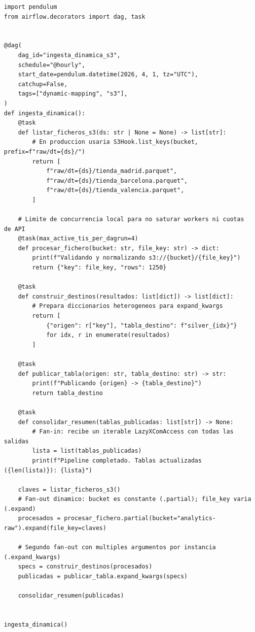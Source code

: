 \begin{lstlisting}[style=python, caption={Fan-out y fan-in dinámico sobre ficheros descubiertos en S3 con \code{.partial()}, \code{.expand()} y \code{expand\_kwargs()}.}, label={lst:dynamic-task-mapping}]
import pendulum
from airflow.decorators import dag, task


@dag(
    dag_id="ingesta_dinamica_s3",
    schedule="@hourly",
    start_date=pendulum.datetime(2026, 4, 1, tz="UTC"),
    catchup=False,
    tags=["dynamic-mapping", "s3"],
)
def ingesta_dinamica():
    @task
    def listar_ficheros_s3(ds: str | None = None) -> list[str]:
        # En produccion usaria S3Hook.list_keys(bucket, prefix=f"raw/dt={ds}/")
        return [
            f"raw/dt={ds}/tienda_madrid.parquet",
            f"raw/dt={ds}/tienda_barcelona.parquet",
            f"raw/dt={ds}/tienda_valencia.parquet",
        ]

    # Limite de concurrencia local para no saturar workers ni cuotas de API
    @task(max_active_tis_per_dagrun=4)
    def procesar_fichero(bucket: str, file_key: str) -> dict:
        print(f"Validando y normalizando s3://{bucket}/{file_key}")
        return {"key": file_key, "rows": 1250}

    @task
    def construir_destinos(resultados: list[dict]) -> list[dict]:
        # Prepara diccionarios heterogeneos para expand_kwargs
        return [
            {"origen": r["key"], "tabla_destino": f"silver_{idx}"}
            for idx, r in enumerate(resultados)
        ]

    @task
    def publicar_tabla(origen: str, tabla_destino: str) -> str:
        print(f"Publicando {origen} -> {tabla_destino}")
        return tabla_destino

    @task
    def consolidar_resumen(tablas_publicadas: list[str]) -> None:
        # Fan-in: recibe un iterable LazyXComAccess con todas las salidas
        lista = list(tablas_publicadas)
        print(f"Pipeline completado. Tablas actualizadas ({len(lista)}): {lista}")

    claves = listar_ficheros_s3()
    # Fan-out dinamico: bucket es constante (.partial); file_key varia (.expand)
    procesados = procesar_fichero.partial(bucket="analytics-raw").expand(file_key=claves)

    # Segundo fan-out con multiples argumentos por instancia (.expand_kwargs)
    specs = construir_destinos(procesados)
    publicadas = publicar_tabla.expand_kwargs(specs)

    consolidar_resumen(publicadas)


ingesta_dinamica()
\end{lstlisting}

